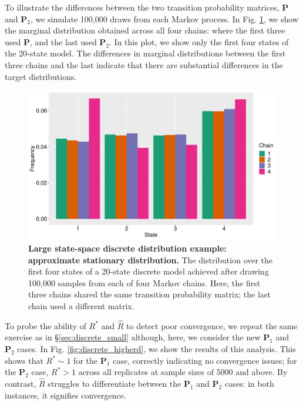 \documentclass[ba]{imsart}
\numberwithin{equation}{section}
\theoremstyle{plain}
\begin{document}
\begin{supplement}
		To illustrate the differences between the two transition probability matrices, $\boldsymbol{P}$ and $\boldsymbol{P}_2$, we simulate 100,000 draws from each Markov process. In Fig. \ref{fig:discrete_stationary_higherd}, we show the marginal distribution obtained across all four chains: where the first three used $\boldsymbol{P}$, and the last used $\boldsymbol{P}_2$. In this plot, we show only the first four states of the 20-state model. The differences in marginal distributions between the first three chains and the last indicate that there are substantial differences in the target distributions.
		
		\begin{figure}[!htb]
			\centerline{\includegraphics[width=1.0\textwidth]{discrete_stationary_higherd.pdf}}
			\caption{\textbf{Large state-space discrete distribution example: approximate stationary distribution.} The distribution over the first four states of a 20-state discrete model achieved after drawing 100,000 samples from each of four Markov chains. Here, the first three chains shared the same transition probability matrix; the last chain used a different matrix.}
			\label{fig:discrete_stationary_higherd}
		\end{figure}
		
		To probe the ability of $R^*$ and $\widehat{R}$ to detect poor convergence, we repeat the same exercise as in \S\ref{sec:discrete_small} although, here, we consider the new $\boldsymbol{P}_1$ and $\boldsymbol{P}_2$ cases. In Fig. \ref{fig:discrete_higherd}, we show the results of this analysis. This shows that $R^*\sim 1$ for the $\boldsymbol{P}_1$ case, correctly indicating no convergence issues; for the $\boldsymbol{P}_2$ case, $R^*>1$ across all replicates at sample sizes of 5000 and above. By contrast, $\widehat{R}$ struggles to differentiate between the $\boldsymbol{P}_1$ and $\boldsymbol{P}_2$ cases: in both instances, it signifies convergence.
		

\end{supplement}
\end{document}
